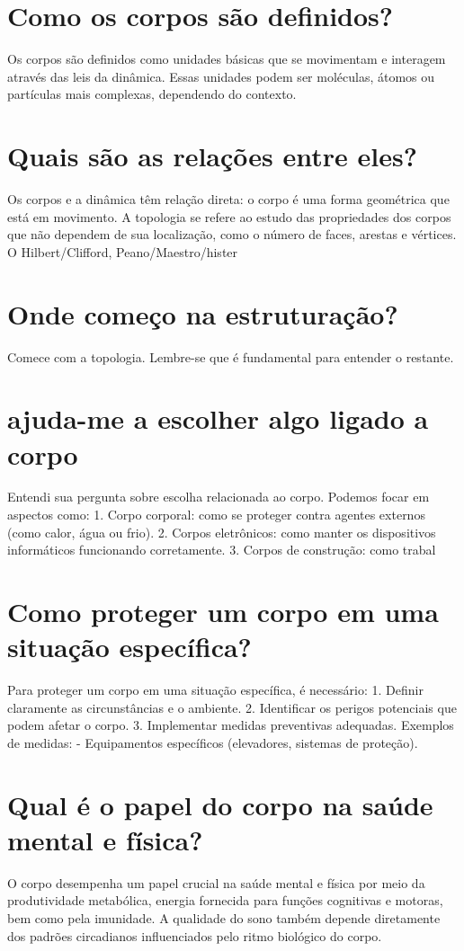 \documentclass[11pt,a4paper]{article}
\begin{document}
\section{Como os corpos são definidos?}
Os corpos são definidos como unidades básicas que se movimentam e interagem através das leis da dinâmica. Essas unidades podem ser moléculas, átomos ou partículas mais complexas, dependendo do contexto.

\section{Quais são as relações entre eles?}
Os corpos e a dinâmica têm relação direta: o corpo é uma forma geométrica que está em movimento. A topologia se refere ao estudo das propriedades dos corpos que não dependem de sua localização, como o número de faces, arestas e vértices. O Hilbert/Clifford, Peano/Maestro/hister

\section{Onde começo na estruturação?}
Comece com a topologia. Lembre-se que é fundamental para entender o restante.

\section{ajuda-me a escolher algo ligado a corpo}
Entendi sua pergunta sobre escolha relacionada ao corpo. Podemos focar em aspectos como: 1. Corpo corporal: como se proteger contra agentes externos (como calor, água ou frio). 2. Corpos eletrônicos: como manter os dispositivos informáticos funcionando corretamente. 3. Corpos de construção: como trabal

\section{Como proteger um corpo em uma situação específica?}
Para proteger um corpo em uma situação específica, é necessário: 1. Definir claramente as circunstâncias e o ambiente. 2. Identificar os perigos potenciais que podem afetar o corpo. 3. Implementar medidas preventivas adequadas. Exemplos de medidas: - Equipamentos específicos (elevadores, sistemas de proteção).

\section{Qual é o papel do corpo na saúde mental e física?}
O corpo desempenha um papel crucial na saúde mental e física por meio da produtividade metabólica, energia fornecida para funções cognitivas e motoras, bem como pela imunidade. A qualidade do sono também depende diretamente dos padrões circadianos influenciados pelo ritmo biológico do corpo.
\end{document}
